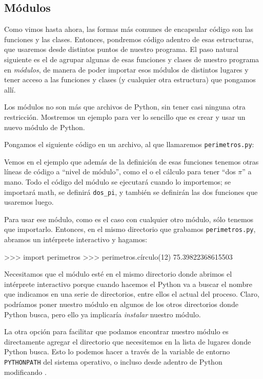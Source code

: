 

\subsection{Módulos}\label{sub:modulos}

Como vimos hasta ahora, las formas más comunes de encapsular código son las funciones y las clases. Entonces, pondremos código adentro de esas estructuras, que usaremos desde distintos puntos de nuestro programa. El paso natural siguiente es el de agrupar algunas de esas funciones y clases de nuestro programa en \textit{módulos}, de manera de poder importar esos módulos de distintos lugares y tener acceso a las funciones y clases (y cualquier otra estructura) que pongamos allí.

Los módulos no son más que archivos de Python, sin tener casi ninguna otra restricción. Mostremos un ejemplo para ver lo sencillo que es crear y usar un nuevo módulo de Python.

Pongamos el siguiente código en un archivo, al que llamaremos \texttt{perimetros.py}:


Vemos en el ejemplo que además de la definición de esas funciones tenemos otras líneas de código a ``nivel de módulo'', como el  o el cálculo para tener ``dos $\pi$'' a mano. Todo el código del módulo se ejecutará cuando lo importemos; se importará math, se definirá \texttt{dos\_pi}, y también se definirán las dos funciones que usaremos luego.

Para usar ese módulo, como es el caso con cualquier otro módulo, sólo tenemos que importarlo. Entonces, en el mismo directorio que grabamos \texttt{perimetros.py}, abramos un intérprete interactivo y hagamos:

\begin{py}  
>>> import perimetros
>>> perimetros.círculo(12)
75.39822368615503
\end{py}

Necesitamos que el módulo esté en el mismo directorio donde abrimos el intérprete interactivo porque cuando hacemos el  Python va a buscar el nombre que indicamos en una serie de directorios, entre ellos el actual del proceso. Claro, podríamos poner nuestro módulo en algunos de los otros directorios donde Python busca, pero ello ya implicaría \textit{instalar} nuestro módulo.

La otra opción para facilitar que podamos encontrar nuestro módulo es directamente agregar el directorio que necesitemos en la lista de lugares donde Python busca. Esto lo podemos hacer a través de la variable de entorno \texttt{PYTHONPATH} del sistema operativo, o incluso desde adentro de Python modificando .

